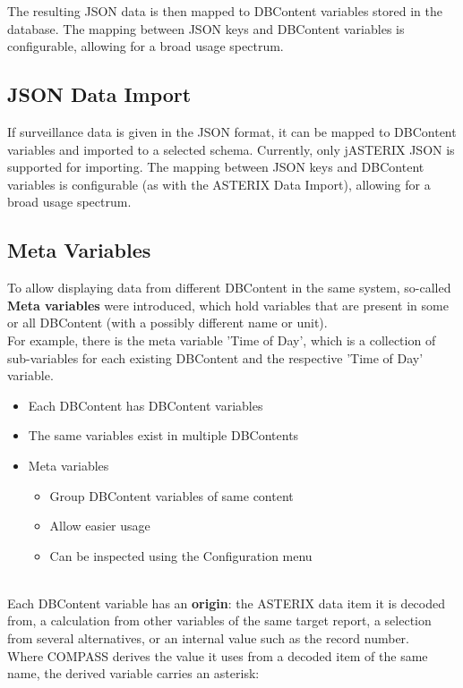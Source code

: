 The resulting JSON data is then mapped to DBContent variables stored in the database. The mapping between JSON keys and DBContent variables is configurable, allowing for a broad usage spectrum.

\subsection*{JSON Data Import}
If surveillance data is given in the JSON format, it can be mapped to DBContent variables and imported to a selected schema. Currently, only jASTERIX JSON is supported for importing. The mapping between JSON keys and DBContent variables is configurable (as with the ASTERIX Data Import), allowing for a broad usage spectrum.

\subsection*{Meta Variables}

To allow displaying data from different DBContent in the same system, so-called \textbf{Meta variables} were introduced, which hold variables that are present in some or all DBContent (with a possibly different name or unit). \\
For example, there is the meta variable 'Time of Day', which is a collection of sub-variables for each existing DBContent and the respective 'Time of Day' variable. \\

\begin{itemize}
\item Each DBContent has DBContent variables
\item The same variables exist in multiple DBContents
\item Meta variables
\begin{itemize}
\item Group DBContent variables of same content
\item Allow easier usage
\item Can be inspected using the Configuration menu
\end{itemize}
\end{itemize}
\ \\

Each DBContent variable has an \textbf{origin}: the ASTERIX data item it is decoded from, a calculation from other variables of the same target report, a selection from several alternatives, or an internal value such as the record number. \\
Where COMPASS derives the value it uses from a decoded item of the same name, the derived variable carries an asterisk: \\

